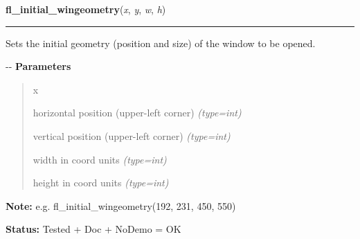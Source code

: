 \hspace{.8\funcindent}\begin{boxedminipage}{\funcwidth}

    \raggedright \textbf{fl\_initial\_wingeometry}(\textit{x}, \textit{y}, \textit{w}, \textit{h})

    \vspace{-1.5ex}

    \rule{\textwidth}{0.5\fboxrule}
\setlength{\parskip}{2ex}

Sets the initial geometry (position and size) of the window to be
opened.

-{}-
\setlength{\parskip}{1ex}
      \textbf{Parameters}
      \vspace{-1ex}

      \begin{quote}
        \begin{Ventry}{x}

          \item[x]


horizontal position (upper-left corner)
            {\it (type=int)}

          \item[y]


vertical position (upper-left corner)
            {\it (type=int)}

          \item[w]


width in coord units
            {\it (type=int)}

          \item[h]


height in coord units
            {\it (type=int)}

        \end{Ventry}

      \end{quote}

\textbf{Note:} 
e.g. fl\_initial\_wingeometry(192, 231, 450, 550)


\textbf{Status:} 
Tested + Doc + NoDemo = OK


    \end{boxedminipage}

    \label{xformslib:flxbasic:fl_noborder}

    \vspace{0.5ex}

